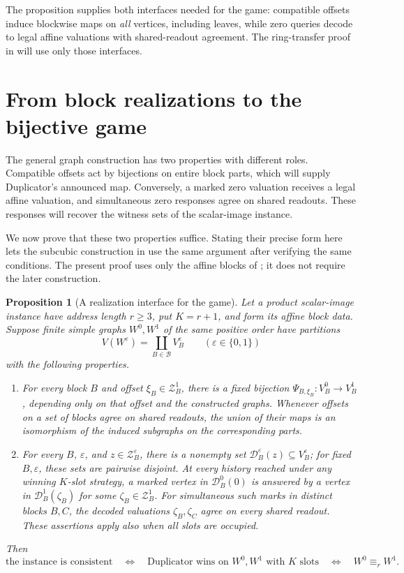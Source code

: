 \documentclass[11pt]{article}
\newtheorem{proposition}[theorem]{Proposition}
\theoremstyle{definition}
\newcommand{\cB}{\mathcal B}
\newcommand{\cZ}{\mathcal Z}
\newcommand{\eps}{\varepsilon}
\begin{document}
The proposition supplies both interfaces needed for the game:
compatible offsets induce blockwise maps on \emph{all} vertices,
including leaves, while zero queries decode to legal affine
valuations with shared-readout agreement. The ring-transfer proof
in  will use only those interfaces.

\section{From block realizations to the bijective game}
\label{reduction:section}

The general graph construction has two properties with different roles.
Compatible offsets act by bijections on entire block parts, which will
supply Duplicator's announced map. Conversely, a marked zero valuation
receives a legal affine valuation, and simultaneous zero responses agree
on shared readouts. These responses will recover the witness sets of
the scalar-image instance.

We now prove that these two properties suffice. Stating their precise
form here lets the subcubic construction in  use
the same argument after verifying the same conditions. The present
proof uses only the affine blocks of ; it does
not require the later construction.

\begin{proposition}[A realization interface for the game]
\label{prop:game-reduction}
Let a product scalar-image instance have address length \(r\ge3\),
put \(K=r+1\), and form its affine block data. Suppose finite simple
graphs \(W^0,W^1\) of the same positive order have partitions
\[
 V(W^\eps)=\coprod_{B\in\cB}V_B^\eps
 \qquad(\eps\in\{0,1\})
\]
with the following properties.
\begin{enumerate}
\item\label{item:game-local-maps}
For every block \(B\) and offset \(\xi_B\in\cZ_B^1\), there is a
fixed bijection
\(\Psi_{B,\xi_B}:V_B^0\to V_B^1\), depending only on that offset
and the constructed graphs. Whenever offsets on a set of blocks agree
on shared readouts, the union of their maps is an isomorphism of the
induced subgraphs on the corresponding parts.
\item\label{item:game-zero-decoding}
For every \(B\), \(\eps\), and \(z\in\cZ_B^\eps\), there is a
nonempty set \(\mathcal D_B^\eps(z)\subseteq V_B^\eps\); for fixed
\(B,\eps\), these sets are pairwise disjoint. At every history
reached under any winning \(K\)-slot strategy, a marked vertex in
\(\mathcal D_B^0(0)\) is answered by a vertex in
\(\mathcal D_B^1(\zeta_B)\) for some \(\zeta_B\in\cZ_B^1\).
For simultaneous such marks in distinct blocks \(B,C\), the decoded
valuations \(\zeta_B,\zeta_C\) agree on every shared readout.
These assertions apply also when all slots are occupied.
\end{enumerate}
Then
\[
 \text{the instance is consistent}
 \quad\Longleftrightarrow\quad
 \text{Duplicator wins on \(W^0,W^1\) with \(K\) slots}
 \quad\Longleftrightarrow\quad W^0\equiv_r W^1.
\]
\end{proposition}
\end{document}
